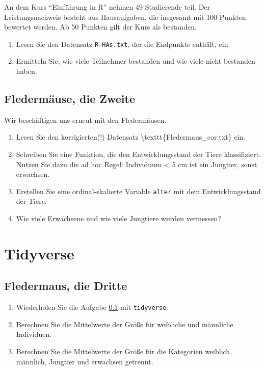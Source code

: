 \documentclass[]{book}
\providecommand{\tightlist}{%
  \setlength{\itemsep}{0pt}\setlength{\parskip}{0pt}}
\begin{document}
An dem Kurs ``Einführung in R'' nehmen 49 Studierende teil. Der Leistungsnachweis besteht aus Hausaufgaben, die insgesamt mit 100 Punkten bewertet werden. Ab 50 Punkten gilt der Kurs als bestanden.

\begin{enumerate}
\def\labelenumi{\arabic{enumi}.}
\tightlist
\item
  Lesen Sie den Datensatz \texttt{R-HAs.txt}, der die Endpunkte enthält, ein.
\item
  Ermitteln Sie, wie viele Teilnehmer bestanden und wie viele nicht bestanden haben.
\end{enumerate}

\hypertarget{fledermaus}{%
\subsection{Fledermäuse, die Zweite}\label{fledermaus}}

Wir beschäftigen uns erneut mit den Fledermäusen.

\begin{enumerate}
\def\labelenumi{\arabic{enumi}.}
\tightlist
\item
  Lesen Sie den korrigierten(!) Datensatz \textbackslash{}texttt\{Fledermaus\_cor.txt\} ein.
\item
  Schreiben Sie eine Funktion, die den Entwicklungsstand der Tiere klassifiziert. Nutzen Sie dazu die ad hoc Regel: Individuum \textless{} 5 cm ist ein Jungtier, sonst erwachsen.
\item
  Erstellen Sie eine ordinal-skalierte Variable \texttt{alter} mit dem Entwicklungsstand der Tiere.
\item
  Wie viele Erwachsene und wie viele Jungtiere wurden vermessen?
\end{enumerate}

\hypertarget{tidyverse-1}{%
\section{Tidyverse}\label{tidyverse-1}}

\hypertarget{fledermaus3}{%
\subsection{Fledermaus, die Dritte}\label{fledermaus3}}

\begin{enumerate}
\def\labelenumi{\arabic{enumi}.}
\tightlist
\item
  Wiederholen Sie die Aufgabe \ref{fledermaus} mit \texttt{tidyverse}
\item
  Berechnen Sie die Mittelwerte der Größe für weibliche und männliche Individuen.
\item
  Berechnen Sie die Mittelwerte der Größe für die Kategorien weiblich, männlich, Jungtier und erwachsen getrennt.
\end{enumerate}
\end{document}
